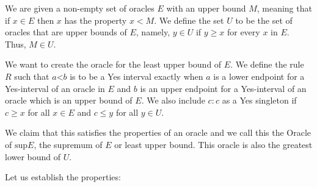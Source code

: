\documentclass[12pt]{article}
\theoremstyle{remark}
\newcommand{\lt}{\mathord{<}}
\begin{document}
We are given a non-empty set of oracles $E$ with an upper bound $M$, meaning that if $x \in E$ then $x$ has the property $x < M$. We define the set $U$ to be the set of oracles that are upper bounds of $E$, namely, $y \in U$ if $y \geq x$ for every $x$ in $E$.  Thus, $M \in U$.

We want to create the oracle for the least upper bound of $E$. We define the rule $R$ such that $a\lt b$ is to be a Yes interval exactly when $a$ is a lower endpoint for a Yes-interval of an oracle in $E$ and $b$ is an upper endpoint for a Yes-interval of an oracle which is an upper bound of $E$. We also include $c:c$ as a Yes singleton if $c \geq x$ for all $x \in E$ and $c \leq y$ for all $y\in U$.

We claim that this satisfies the properties of an oracle and we call this the Oracle of $\mathrm{sup} E$, the supremum of $E$ or least upper bound. This oracle is also the greatest lower bound of $U$.

Let us establish the properties: 
\end{document}
